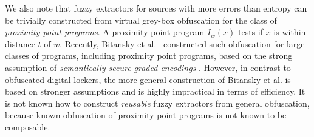 \documentclass[11pt]{article}
\newcommand{\Huse}{\mathrm{H}_{\mathtt{usable}}}
\newcommand{\authnote}[2]{{\textcolor{red}{\textsf{#1 notes: }\textcolor{blue}{ #2}}\marginpar{\textcolor{red}{\textbf{!!!!!}}}}}
\newcommand{\authnote}[2]{}
\newcommand{\bnote}[1]{{\authnote{Ben}{#1}}}
\newcommand{\lnote}[1]{{\authnote{Leo}{#1}}}
\begin{document}
We also note that fuzzy extractors for sources with more errors than entropy can be trivially constructed from virtual grey-box obfuscation for the class of {\em proximity point programs}. A proximity point program $I_w(x)$ tests if $x$ is within distance $t$ of $w$. 
Recently, Bitansky et al.~\cite{BitanskyCKP14} constructed such obfuscation for large classes of programs, including proximity point programs, based on the strong assumption of {\em semantically secure graded encodings} \cite{PassTS13}.
However, in contrast to obfuscated digital lockers, the  more general construction of Bitansky et al. is based on stronger assumptions and is highly impractical in terms of efficiency.  
It is not known how to construct \emph{reusable} fuzzy extractors from general obfuscation, because known obfuscation of proximity point programs is not known to be composable.



\end{document}

